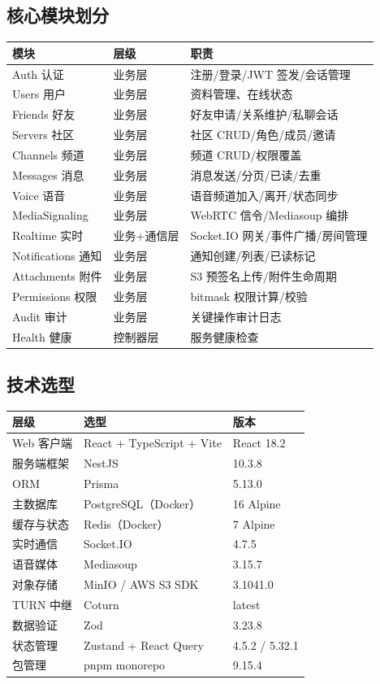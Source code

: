 \subsection{核心模块划分}
\begin{center}
\begin{tabularx}{\textwidth}{L{2.8cm}L{2.5cm}Y}
\toprule
\textbf{模块} & \textbf{层级} & \textbf{职责} \\
\midrule
Auth 认证 & 业务层 & 注册/登录/JWT 签发/会话管理 \\
Users 用户 & 业务层 & 资料管理、在线状态 \\
Friends 好友 & 业务层 & 好友申请/关系维护/私聊会话 \\
Servers 社区 & 业务层 & 社区 CRUD/角色/成员/邀请 \\
Channels 频道 & 业务层 & 频道 CRUD/权限覆盖 \\
Messages 消息 & 业务层 & 消息发送/分页/已读/去重 \\
Voice 语音 & 业务层 & 语音频道加入/离开/状态同步 \\
MediaSignaling & 业务层 & WebRTC 信令/Mediasoup 编排 \\
Realtime 实时 & 业务+通信层 & Socket.IO 网关/事件广播/房间管理 \\
Notifications 通知 & 业务层 & 通知创建/列表/已读标记 \\
Attachments 附件 & 业务层 & S3 预签名上传/附件生命周期 \\
Permissions 权限 & 业务层 & bitmask 权限计算/校验 \\
Audit 审计 & 业务层 & 关键操作审计日志 \\
Health 健康 & 控制器层 & 服务健康检查 \\
\bottomrule
\end{tabularx}
\end{center}

\subsection{技术选型}
\begin{tabularx}{\textwidth}{L{3.5cm}L{3.5cm}L{4.5cm}}
\toprule
\textbf{层级} & \textbf{选型} & \textbf{版本} \\
\midrule
Web 客户端 & React + TypeScript + Vite & React 18.2 \\
服务端框架 & NestJS & 10.3.8 \\
ORM & Prisma & 5.13.0 \\
主数据库 & PostgreSQL（Docker） & 16 Alpine \\
缓存与状态 & Redis（Docker） & 7 Alpine \\
实时通信 & Socket.IO & 4.7.5 \\
语音媒体 & Mediasoup & 3.15.7 \\
对象存储 & MinIO / AWS S3 SDK & 3.1041.0 \\
TURN 中继 & Coturn & latest \\
数据验证 & Zod & 3.23.8 \\
状态管理 & Zustand + React Query & 4.5.2 / 5.32.1 \\
包管理 & pnpm monorepo & 9.15.4 \\
\bottomrule
\end{tabularx}

